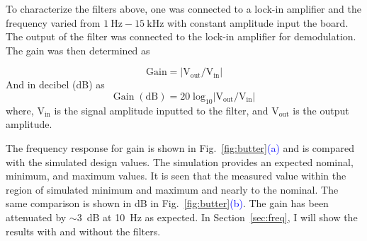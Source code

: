 To characterize the filters above, one was connected to a lock-in amplifier and the frequency varied from $\mathrm{1~Hz-15~kHz}$ with constant amplitude input the board. The output of the filter was connected to the lock-in amplifier for demodulation. The gain was then determined as 

\begin{equation}\label{eq:filter_gain}
    \mathrm{Gain=|V_{out}/V_{in}|}
\end{equation}
And in decibel (dB) as
\begin{equation}\label{eq:filter_gain_db}
    \mathrm{Gain\;(dB)=20\;log_{10}|V_{out}/V_{in}|}
\end{equation}
where, $\mathrm{V_{in}}$ is the signal amplitude inputted to the filter, and $\mathrm{V_{out}}$ is the output amplitude.


The frequency response for gain is shown in Fig.~\ref{fig:butter}\textcolor{blue}{(a)} and is compared with the simulated design values. The simulation provides an expected nominal, minimum, and maximum values. It is seen that the measured value within the region of simulated minimum and maximum and nearly to the nominal. The same comparison is shown in dB in Fig.~\ref{fig:butter}\textcolor{blue}{(b)}. The gain has been attenuated by $\sim3$~dB at 10~Hz as expected. In Section~\ref{sec:freq}, I will show the results with and without the filters.








